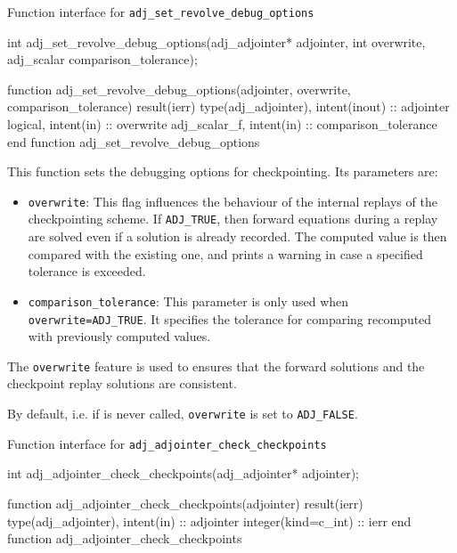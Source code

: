 \begin{boxwithtitle}{Function interface for \texttt{adj_set_revolve_debug_options}}
\begin{minipage}{\columnwidth}
\begin{ccode}
int adj_set_revolve_debug_options(adj_adjointer* adjointer, int overwrite, 
                                  adj_scalar comparison_tolerance);
\end{ccode}
\begin{fortrancode}
function adj_set_revolve_debug_options(adjointer, overwrite, comparison_tolerance) 
                                      result(ierr)
  type(adj_adjointer), intent(inout) :: adjointer
  logical, intent(in) :: overwrite
  adj_scalar_f, intent(in) :: comparison_tolerance
end function adj_set_revolve_debug_options
\end{fortrancode}
\end{minipage}
\end{boxwithtitle}

This function sets the debugging options for checkpointing. Its parameters are: 
\begin{itemize}
\item \texttt{overwrite}: This flag influences the behaviour of the internal replays of the checkpointing scheme. If \texttt{ADJ_TRUE}, then forward equations during a replay are solved even if a solution is already recorded. The computed value is then compared with the existing one, and prints a warning in case a specified tolerance is exceeded.
\item \texttt{comparison_tolerance}: This parameter is only used when \texttt{overwrite=ADJ_TRUE}. It specifies the tolerance for comparing recomputed with previously computed values.
\end{itemize}
The \texttt{overwrite} feature is used to ensures that the forward solutions and the checkpoint replay solutions are consistent.

By default, i.e. if  is never called, \texttt{overwrite} is set to \texttt{ADJ_FALSE}.

\begin{boxwithtitle}{Function interface for \texttt{adj_adjointer_check_checkpoints}}
\begin{minipage}{\columnwidth}
\begin{ccode}
int adj_adjointer_check_checkpoints(adj_adjointer* adjointer);
\end{ccode}
\begin{fortrancode}
function adj_adjointer_check_checkpoints(adjointer) result(ierr) 
  type(adj_adjointer), intent(in) :: adjointer
  integer(kind=c_int) :: ierr
end function adj_adjointer_check_checkpoints
\end{fortrancode}
\end{minipage}
\end{boxwithtitle}


